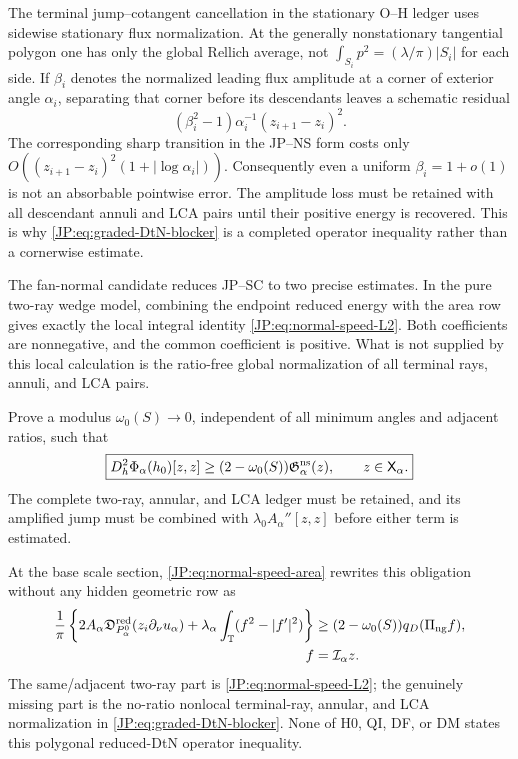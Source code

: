 \begin{remark}
The terminal jump--cotangent cancellation in the stationary O--H ledger
uses sidewise stationary flux normalization.  At the generally
nonstationary tangential polygon one has only the global Rellich average,
not
\(
 \int_{S_i}p^2=(\lambda/\pi)|S_i|
\)
for each side.  If $\beta_i$ denotes the normalized leading flux amplitude
at a corner of exterior angle $\alpha_i$, separating that corner before
its descendants leaves a schematic residual
\[
 (\beta_i^2-1)\alpha_i^{-1}(z_{i+1}-z_i)^2.
\]
The corresponding sharp transition in the JP--NS form costs only
$O((z_{i+1}-z_i)^2(1+|\log\alpha_i|))$.  Consequently even a uniform
$\beta_i=1+o(1)$ is not an absorbable pointwise error.  The amplitude loss
must be retained with all descendant annuli and LCA pairs until their
positive energy is recovered.  This is why \eqref{JP:eq:graded-DtN-blocker}
is a completed operator inequality rather than a cornerwise estimate.
\end{remark}

The fan-normal candidate reduces JP--SC to two precise estimates.  In the
pure two-ray wedge model, combining the endpoint reduced energy with the
area row gives exactly the local integral identity
\eqref{JP:eq:normal-speed-L2}.
Both coefficients are nonnegative, and the common coefficient is positive.
What is not supplied by this local calculation is the ratio-free global
normalization of all terminal rays, annuli, and LCA pairs.

\begin{remark}
\label{JP:rem:S0}
Prove a modulus $\omega_0(S)\to0$, independent of all minimum angles and
adjacent ratios, such that
\begin{equation}\label{JP:eq:S0}
 \boxed{
 D_h^2\Phi_\alpha(h_0)[z,z]
 \ge(2-\omega_0(S))\mathfrak G_\alpha^{\rm ns}(z),
 \qquad z\in\mathsf X_\alpha.}
\end{equation}
The complete two-ray, annular, and LCA ledger must be retained, and its
amplified jump must be combined with $\lambda_0A_\alpha''[z,z]$ before
either term is estimated.
\end{remark}

At the base scale section, \eqref{JP:eq:normal-speed-area} rewrites this
obligation without any hidden geometric row as
\begin{equation}\label{JP:eq:graded-DtN-blocker}
 \begin{aligned}
 \frac1\pi\left\{
 2A_\alpha\mathfrak D^{\rm red}_{P_\alpha^0}(z_i\partial_\nu u_\alpha)
 +\lambda_\alpha\int_{\mathbb T}(f^2-|f'|^2)\right\}
 &\ge(2-\omega_0(S))q_D(\Pi_{\rm ng}f),\\
 f&=\mathcal I_\alpha z.
 \end{aligned}
\end{equation}
The same/adjacent two-ray part is \eqref{JP:eq:normal-speed-L2}; the genuinely
missing part is the no-ratio nonlocal terminal-ray, annular, and LCA
normalization in \eqref{JP:eq:graded-DtN-blocker}.  None of H0, QI, DF, or DM
states this polygonal reduced-DtN operator inequality.

